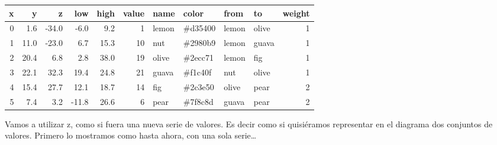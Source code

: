 \documentclass[
]{book}
\newenvironment{Shaded}{\begin{snugshade}}{\end{snugshade}}
\newcommand{\AttributeTok}[1]{\textcolor[rgb]{0.77,0.63,0.00}{#1}}
\newcommand{\CommentTok}[1]{\textcolor[rgb]{0.56,0.35,0.01}{\textit{#1}}}
\newcommand{\ConstantTok}[1]{\textcolor[rgb]{0.00,0.00,0.00}{#1}}
\newcommand{\FunctionTok}[1]{\textcolor[rgb]{0.00,0.00,0.00}{#1}}
\newcommand{\NormalTok}[1]{#1}
\newcommand{\OtherTok}[1]{\textcolor[rgb]{0.56,0.35,0.01}{#1}}
\newcommand{\SpecialCharTok}[1]{\textcolor[rgb]{0.00,0.00,0.00}{#1}}
\newcommand{\StringTok}[1]{\textcolor[rgb]{0.31,0.60,0.02}{#1}}
\begin{document}
\begin{tabular}{r|r|r|r|r|r|l|l|l|l|r}
\hline
x & y & z & low & high & value & name & color & from & to & weight\\
\hline
0 & 1.6 & -34.0 & -6.0 & 9.2 & 1 & lemon & \#d35400 & lemon & olive & 1\\
\hline
1 & 11.0 & -23.0 & 6.7 & 15.3 & 10 & nut & \#2980b9 & lemon & guava & 1\\
\hline
2 & 20.4 & 6.8 & 2.8 & 38.0 & 19 & olive & \#2ecc71 & lemon & fig & 1\\
\hline
3 & 22.1 & 32.3 & 19.4 & 24.8 & 21 & guava & \#f1c40f & nut & olive & 1\\
\hline
4 & 15.4 & 27.7 & 12.1 & 18.7 & 14 & fig & \#2c3e50 & olive & pear & 2\\
\hline
5 & 7.4 & 3.2 & -11.8 & 26.6 & 6 & pear & \#7f8c8d & guava & pear & 2\\
\hline
\end{tabular}

Vamos a utilizar z, como si fuera una nueva serie de valores. Es decir como si quisiéramos representar en el diagrama dos conjuntos de valores. Primero lo mostramos como hasta ahora, con una sola serie\ldots{}

\begin{Shaded}
\end{Shaded}
\end{document}
